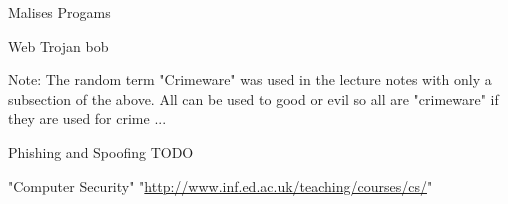 \documentclass[11pt,twoside,a4paper]{article}
\begin{document}
\begin{section}{Malises Progams}
      \begin{subsection}{Web Trojan}
        bob
      \end{subsection}
      
      Note: The random term "Crimeware" was used in the lecture notes with only a subsection of the above. All can be used to good or evil so all are "crimeware" if they are used for crime ...
  
  \end{section}
  
  \clearpage
  
  \begin{section}{Phishing and Spoofing}
    TODO
  \end{section}
  
  \clearpage  
  
  \begin{thebibliography}{9}
      "Computer Security" "\url{http://www.inf.ed.ac.uk/teaching/courses/cs/}"
  \end{thebibliography}
\end{document}
